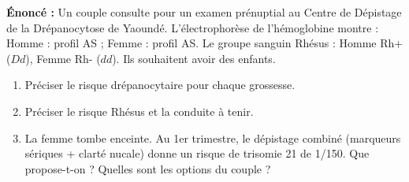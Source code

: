 \documentclass[11pt]{article}
\begin{document}
\begin{exoresolu}
\textbf{Énoncé :} Un couple consulte pour un examen prénuptial au Centre de Dépistage de la Drépanocytose de Yaoundé. L'électrophorèse de l'hémoglobine montre : Homme : profil AS ; Femme : profil AS. Le groupe sanguin Rhésus : Homme Rh+ ($Dd$), Femme Rh- ($dd$). Ils souhaitent avoir des enfants.
\begin{enumerate}
    \item Préciser le risque drépanocytaire pour chaque grossesse.
    \item Préciser le risque Rhésus et la conduite à tenir.
    \item La femme tombe enceinte. Au 1er trimestre, le dépistage combiné (marqueurs sériques + clarté nucale) donne un risque de trisomie 21 de 1/150. Que propose-t-on ? Quelles sont les options du couple ?
\end{enumerate}


\end{exoresolu}
\end{document}
